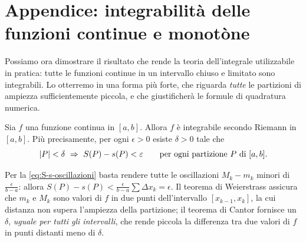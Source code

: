 \section{Appendice: integrabilità delle funzioni continue e monotòne}
\label{sec:integrabilita-continue}

Possiamo ora dimostrare il risultato che rende la teoria dell'integrale utilizzabile in
pratica: tutte le funzioni continue in un intervallo chiuso e limitato sono
integrabili. Lo otterremo in una forma più forte, che riguarda \emph{tutte} le
partizioni di ampiezza sufficientemente piccola, e che giustificherà le formule di
quadratura numerica.

\begin{teorema}\label{teo:integrabilita-continue}
Sia $f$ una funzione continua in $[a,b]$. Allora $f$ è integrabile secondo Riemann in
$[a,b]$. Più precisamente, per ogni $\epsilon>0$ esiste $\delta>0$ tale che
\begin{equation}\label{eq:ampiezza-piccola}
  \lvert P\rvert<\delta \ \Rightarrow\ S(P)-s(P)<\varepsilon \qquad\text{per ogni partizione $P$ di }
  [a,b] .
\end{equation}
\end{teorema}

\begin{schema}
\end{schema}

\begin{strategia}
Per la \eqref{eq:S-s-oscillazioni} basta rendere tutte le oscillazioni $M_{k}-m_{k}$
minori di $\frac\epsilon{b-a}$: allora $S(P)-s(P)<\frac\epsilon{b-a}\sum\Delta
x_{k}=\epsilon$. Il teorema di Weierstrass assicura che $m_{k}$ e $M_{k}$ sono valori di
$f$ in due punti dell'intervallo $[x_{k-1},x_{k}]$, la cui distanza non supera
l'ampiezza della partizione; il teorema di Cantor fornisce un $\delta$, \emph{uguale per
tutti gli intervalli}, che rende piccola la differenza tra due valori di $f$ in punti
distanti meno di $\delta$.
\end{strategia}

